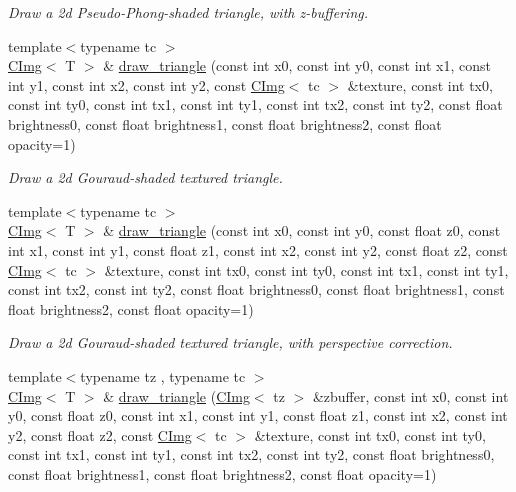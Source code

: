 \begin{DoxyCompactItemize}
\begin{DoxyCompactList}\small\item\em Draw a 2d Pseudo-\/Phong-\/shaded triangle, with z-\/buffering. \item\end{DoxyCompactList}\item 
{\footnotesize template$<$typename tc $>$ }\\\hyperlink{structcimg__library_1_1CImg}{CImg}$<$ T $>$ \& \hyperlink{structcimg__library_1_1CImg_a961363e2672c2ae77788dbe27f1eeb96}{draw\_\-triangle} (const int x0, const int y0, const int x1, const int y1, const int x2, const int y2, const \hyperlink{structcimg__library_1_1CImg}{CImg}$<$ tc $>$ \&texture, const int tx0, const int ty0, const int tx1, const int ty1, const int tx2, const int ty2, const float brightness0, const float brightness1, const float brightness2, const float opacity=1)
\begin{DoxyCompactList}\small\item\em Draw a 2d Gouraud-\/shaded textured triangle. \item\end{DoxyCompactList}\item 
\hypertarget{structcimg__library_1_1CImg_ab8a009041dd95645d02ecc3561d5553f}{
{\footnotesize template$<$typename tc $>$ }\\\hyperlink{structcimg__library_1_1CImg}{CImg}$<$ T $>$ \& \hyperlink{structcimg__library_1_1CImg_ab8a009041dd95645d02ecc3561d5553f}{draw\_\-triangle} (const int x0, const int y0, const float z0, const int x1, const int y1, const float z1, const int x2, const int y2, const float z2, const \hyperlink{structcimg__library_1_1CImg}{CImg}$<$ tc $>$ \&texture, const int tx0, const int ty0, const int tx1, const int ty1, const int tx2, const int ty2, const float brightness0, const float brightness1, const float brightness2, const float opacity=1)}
\label{structcimg__library_1_1CImg_ab8a009041dd95645d02ecc3561d5553f}

\begin{DoxyCompactList}\small\item\em Draw a 2d Gouraud-\/shaded textured triangle, with perspective correction. \item\end{DoxyCompactList}\item 
\hypertarget{structcimg__library_1_1CImg_a7e2f8a5dd27a690961d1c23cddf064fb}{
{\footnotesize template$<$typename tz , typename tc $>$ }\\\hyperlink{structcimg__library_1_1CImg}{CImg}$<$ T $>$ \& \hyperlink{structcimg__library_1_1CImg_a7e2f8a5dd27a690961d1c23cddf064fb}{draw\_\-triangle} (\hyperlink{structcimg__library_1_1CImg}{CImg}$<$ tz $>$ \&zbuffer, const int x0, const int y0, const float z0, const int x1, const int y1, const float z1, const int x2, const int y2, const float z2, const \hyperlink{structcimg__library_1_1CImg}{CImg}$<$ tc $>$ \&texture, const int tx0, const int ty0, const int tx1, const int ty1, const int tx2, const int ty2, const float brightness0, const float brightness1, const float brightness2, const float opacity=1)}
\label{structcimg__library_1_1CImg_a7e2f8a5dd27a690961d1c23cddf064fb}


\end{DoxyCompactItemize}
